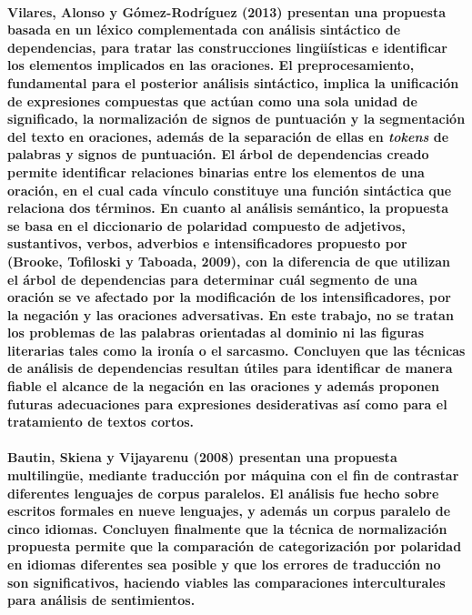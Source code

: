 \paragraph{Vilares, Alonso y G\'omez-Rodr\'iguez (2013) presentan una propuesta basada en un l\'exico complementada con an\'alisis sint\'actico de dependencias, para tratar las construcciones ling\"u\'isticas e identificar los elementos implicados en las oraciones. El preprocesamiento, fundamental para el posterior an\'alisis sint\'actico, implica la unificaci\'on de expresiones compuestas que act\'uan como una sola unidad de significado, la normalizaci\'on de signos de puntuaci\'on y la segmentaci\'on del texto en oraciones, adem\'as de la separaci\'on de ellas en \textit{tokens} de palabras y signos de puntuaci\'on. El \'arbol de dependencias creado permite identificar relaciones binarias entre los elementos de una oraci\'on, en el cual cada v\'inculo constituye una funci\'on sint\'actica que relaciona dos t\'erminos. En cuanto al an\'alisis sem\'antico, la propuesta se basa en el diccionario de polaridad compuesto de adjetivos, sustantivos, verbos, adverbios e intensificadores propuesto por (Brooke, Tofiloski y Taboada, 2009), con la diferencia de que utilizan el \'arbol de dependencias para determinar cu\'al segmento de una oraci\'on se ve afectado por la modificaci\'on de los intensificadores, por la negaci\'on y las oraciones adversativas. En este trabajo, no se tratan los problemas de las palabras orientadas al dominio ni las figuras literarias tales como la iron\'ia o el sarcasmo. Concluyen que las t\'ecnicas de an\'alisis de dependencias resultan \'utiles para identificar de manera fiable el alcance de la negaci\'on en las oraciones y adem\'as proponen futuras adecuaciones para expresiones desiderativas as\'i como para el tratamiento de textos cortos.}

\paragraph{Bautin, Skiena y Vijayarenu (2008) presentan una propuesta multiling\"ue, mediante traducci\'on por m\'aquina con el fin de contrastar diferentes lenguajes de corpus paralelos. El an\'alisis fue hecho sobre escritos formales en nueve lenguajes, y adem\'as un corpus paralelo de cinco idiomas. Concluyen finalmente que la t\'ecnica de normalizaci\'on propuesta permite que la comparaci\'on de categorizaci\'on por polaridad en idiomas diferentes sea posible y que los errores de traducci\'on no son significativos, haciendo viables las comparaciones interculturales para an\'alisis de sentimientos.}

